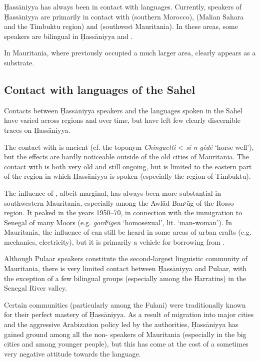\documentclass[output=paper]{langsci/langscibook}
\begin{document}
Ḥassāniyya has always been in contact with  languages. Currently, speakers of Ḥassāniyya are primarily in contact with  (southern Morocco),  (Malian Sahara and the Timbuktu region) and  (southwest Mauritania). In these areas, some speakers are bilingual in Ḥassāniyya and . 

In Mauritania, where  previously occupied a much larger area,  clearly appears as a {substrate}.

\subsection{Contact with languages of the Sahel} %

Contacts between Ḥassāniyya speakers and the languages spoken in the Sahel have varied across regions and over time, but have left few clearly discernible traces on Ḥassāniyya.

The contact with  is ancient (cf. the toponym \textit{Chinguetti} <  \textit{sí-n-gèdé} ‘horse well’), but the effects are hardly noticeable outside of the old cities of Mauritania. The contact with  is both very old and still ongoing, but is limited to the eastern part of the region in which Ḥassāniyya is spoken (especially the region of Timbuktu).

The influence of , albeit marginal, has always been more substantial in southwestern Mauritania, especially among the Awlād Banʸūg of the Rosso region. It peaked in the years 1950–70, in connection with the immigration to Senegal of many Moors (e.g. \textit{gordʸigen} ‘homosexual’, lit. ‘man-woman’). In Mauritania, the influence of  can still be heard in some areas of urban crafts (e.g. mechanics, electricity), but it is primarily a vehicle for borrowing from .

Although Pulaar speakers constitute the second-largest linguistic community of Mauritania, there is very limited contact between Ḥassāniyya and Pulaar, with the exception of a few bilingual groups (especially among the Harratins) in the Senegal River valley.

\hspace*{-0.8981pt}Certain communities (particularly among the Fulani) were traditionally known for their perfect mastery of Ḥassāniyya. As a result of migration into major cities and the aggressive {Arabization} policy led by the authorities, Ḥassāniyya has gained ground among all the non- speakers of Mauritania (especially in the big cities and among younger people), but this has come at the cost of a sometimes very negative attitude towards the language. 
\end{document}
